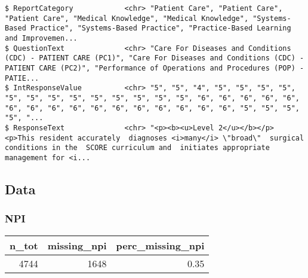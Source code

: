 \documentclass[]{article}
\begin{document}
\begin{verbatim}
$ ReportCategory            <chr> "Patient Care", "Patient Care", "Patient Care", "Medical Knowledge", "Medical Knowledge", "Systems-Based Practice", "Systems-Based Practice", "Practice-Based Learning and Improvemen...
$ QuestionText              <chr> "Care For Diseases and Conditions (CDC) - PATIENT CARE (PC1)", "Care For Diseases and Conditions (CDC) - PATIENT CARE (PC2)", "Performance of Operations and Procedures (POP) - PATIE...
$ IntResponseValue          <chr> "5", "5", "4", "5", "5", "5", "5", "5", "5", "5", "5", "5", "5", "5", "5", "5", "6", "6", "6", "6", "6", "6", "6", "6", "6", "6", "6", "6", "6", "6", "6", "6", "5", "5", "5", "5", "...
$ ResponseText              <chr> "<p><b><u>Level 2</u></b></p> <p>This resident accurately  diagnoses <i>many</i> \"broad\"  surgical conditions in the  SCORE curriculum and  initiates appropriate management for <i...
\end{verbatim}

\hypertarget{data}{%
\subsection{Data}\label{data}}

\hypertarget{npi}{%
\subsubsection{NPI}\label{npi}}

\begin{table}[H]
\centering
\begin{tabular}{r|r|r}
\hline
n\_tot & missing\_npi & perc\_missing\_npi\\
\hline
4744 & 1648 & 0.35\\
\hline
\end{tabular}
\end{table}
\end{document}
